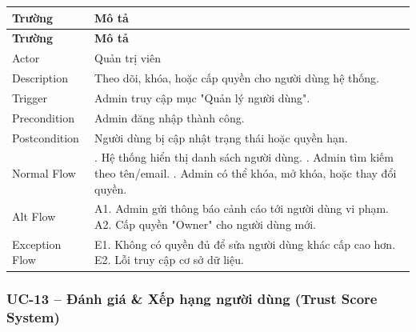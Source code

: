 \begin{longtable}{|>{\raggedright\arraybackslash}p{4cm}|>{\raggedright\arraybackslash}p{11cm}|}
\hline
\textbf{Trường} & \textbf{Mô tả} \\
\hline
\endfirsthead

\hline
\textbf{Trường} & \textbf{Mô tả} \\
\hline
\endhead

\hline
\endfoot

Actor & Quản trị viên \\
\hline
Description & Theo dõi, khóa, hoặc cấp quyền cho người dùng hệ thống. \\
\hline
Trigger & Admin truy cập mục "Quản lý người dùng". \\
\hline
Precondition & Admin đăng nhập thành công. \\
\hline
Postcondition & Người dùng bị cập nhật trạng thái hoặc quyền hạn. \\
\hline
Normal Flow & 1. Hệ thống hiển thị danh sách người dùng. \newline 2. Admin tìm kiếm theo tên/email. \newline 3. Admin có thể khóa, mở khóa, hoặc thay đổi quyền. \\
\hline
Alt Flow & A1. Admin gửi thông báo cảnh cáo tới người dùng vi phạm. \newline A2. Cấp quyền "Owner" cho người dùng mới. \\
\hline
Exception Flow & E1. Không có quyền đủ để sửa người dùng khác cấp cao hơn. \newline E2. Lỗi truy cập cơ sở dữ liệu. \\
\hline
\end{longtable}

\subsubsection*{UC-13 – Đánh giá \& Xếp hạng người dùng (Trust Score System)}

